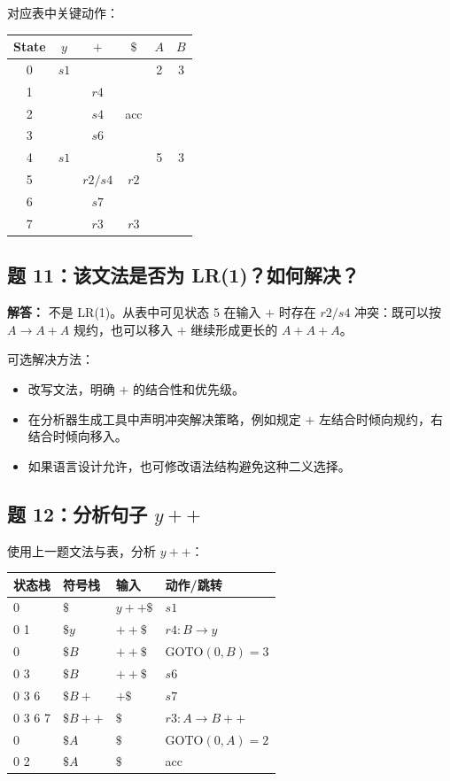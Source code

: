 \documentclass[UTF8,fontset=none,11pt]{ctexart}
\newcommand{\GOTO}{\ensuremath{\mathrm{GOTO}}}
\begin{document}
对应表中关键动作：

\begin{center}
\small
\begin{tabular}{c|ccc|cc}
\toprule
State & \(y\) & \(+\) & \(\$\) & \(A\) & \(B\) \\
\midrule
0 & \(s1\) &  &  & 2 & 3 \\
1 &  & \(r4\) &  &  &  \\
2 &  & \(s4\) & acc &  &  \\
3 &  & \(s6\) &  &  &  \\
4 & \(s1\) &  &  & 5 & 3 \\
5 &  & \(r2/s4\) & \(r2\) &  &  \\
6 &  & \(s7\) &  &  &  \\
7 &  & \(r3\) & \(r3\) &  &  \\
\bottomrule
\end{tabular}
\end{center}

\subsection*{题 11：该文法是否为 LR(1)？如何解决？}

\textbf{解答：} 不是 LR(1)。从表中可见状态 5 在输入 \(+\) 时存在 \(r2/s4\) 冲突：既可以按 \(A\to A+A\) 规约，也可以移入 \(+\) 继续形成更长的 \(A+A+A\)。

可选解决方法：

\begin{itemize}
  \item 改写文法，明确 \(+\) 的结合性和优先级。
  \item 在分析器生成工具中声明冲突解决策略，例如规定 \(+\) 左结合时倾向规约，右结合时倾向移入。
  \item 如果语言设计允许，也可修改语法结构避免这种二义选择。
\end{itemize}

\subsection*{题 12：分析句子 \texorpdfstring{\(y++\)}{y++}}

使用上一题文法与表，分析 \(y++\)：

\begin{center}
\small
\begin{tabular}{llll}
\toprule
状态栈 & 符号栈 & 输入 & 动作/跳转 \\
\midrule
0 & \(\$\) & \(y++\$\) & \(s1\) \\
0 1 & \(\$y\) & \(++\$\) & \(r4: B\to y\) \\
0 & \(\$B\) & \(++\$\) & \(\GOTO(0,B)=3\) \\
0 3 & \(\$B\) & \(++\$\) & \(s6\) \\
0 3 6 & \(\$B+\) & \(+\$\) & \(s7\) \\
0 3 6 7 & \(\$B++\) & \(\$\) & \(r3: A\to B++\) \\
0 & \(\$A\) & \(\$\) & \(\GOTO(0,A)=2\) \\
0 2 & \(\$A\) & \(\$\) & acc \\
\bottomrule
\end{tabular}
\end{center}
\end{document}
